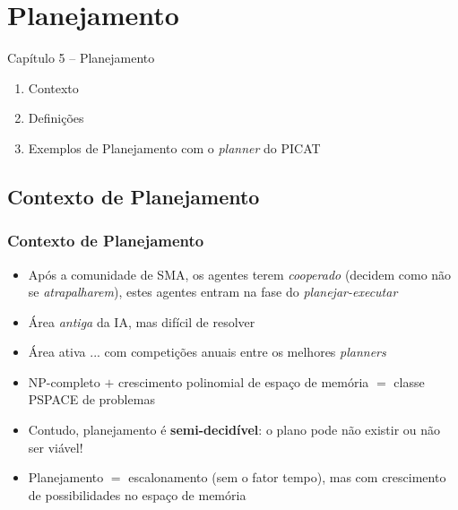 
\section{Planejamento}
\begin{frame}

\begin{center}
{\huge Capítulo 5 -- Planejamento}



\begin{enumerate}
  \item Contexto
  \item Definições
  \item Exemplos de Planejamento com o \textit{planner} do PICAT
\end{enumerate}

\end{center}

\end{frame}





\subsection{Contexto de Planejamento}
\begin{frame} [allowframebreaks=0.9]


    \frametitle{Contexto de Planejamento}
    \begin{itemize}
    
      \item Após a comunidade de SMA, os agentes terem \textit{cooperado} (decidem como não se    \textit{atrapalharem}), estes agentes entram na fase do \textit{planejar-executar}

      \item Área \textit{antiga} da IA, mas difícil de resolver
     
      \item Área ativa ... com competições anuais entre os melhores \textit{planners}
             
      \item NP-completo $+$ crescimento polinomial de espaço de memória $=$ classe PSPACE de problemas
      
       \item Contudo, planejamento é 
       \textbf{semi-decidível}: o plano pode não existir ou não ser viável!
       
      \item Planejamento $=$ escalonamento (sem o fator tempo), mas com crescimento de possibilidades no espaço de memória
      
    \end{itemize}
\end{frame}
